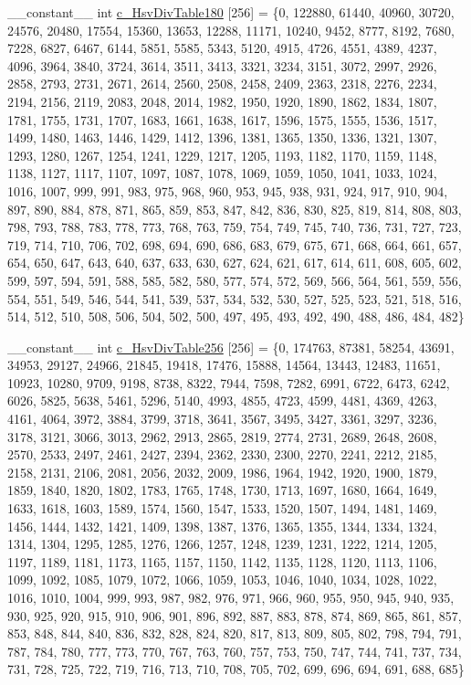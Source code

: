 \begin{DoxyCompactItemize}
\-\_\-\-\_\-constant\-\_\-\-\_\- int \hyperlink{namespacecv_1_1gpu_1_1device_1_1color__detail_abd5c2e4a272bbff844c98d0fccdcb3fa}{c\-\_\-\-Hsv\-Div\-Table180} \mbox{[}256\mbox{]} = \{0, 122880, 61440, 40960, 30720, 24576, 20480, 17554, 15360, 13653, 12288, 11171, 10240, 9452, 8777, 8192, 7680, 7228, 6827, 6467, 6144, 5851, 5585, 5343, 5120, 4915, 4726, 4551, 4389, 4237, 4096, 3964, 3840, 3724, 3614, 3511, 3413, 3321, 3234, 3151, 3072, 2997, 2926, 2858, 2793, 2731, 2671, 2614, 2560, 2508, 2458, 2409, 2363, 2318, 2276, 2234, 2194, 2156, 2119, 2083, 2048, 2014, 1982, 1950, 1920, 1890, 1862, 1834, 1807, 1781, 1755, 1731, 1707, 1683, 1661, 1638, 1617, 1596, 1575, 1555, 1536, 1517, 1499, 1480, 1463, 1446, 1429, 1412, 1396, 1381, 1365, 1350, 1336, 1321, 1307, 1293, 1280, 1267, 1254, 1241, 1229, 1217, 1205, 1193, 1182, 1170, 1159, 1148, 1138, 1127, 1117, 1107, 1097, 1087, 1078, 1069, 1059, 1050, 1041, 1033, 1024, 1016, 1007, 999, 991, 983, 975, 968, 960, 953, 945, 938, 931, 924, 917, 910, 904, 897, 890, 884, 878, 871, 865, 859, 853, 847, 842, 836, 830, 825, 819, 814, 808, 803, 798, 793, 788, 783, 778, 773, 768, 763, 759, 754, 749, 745, 740, 736, 731, 727, 723, 719, 714, 710, 706, 702, 698, 694, 690, 686, 683, 679, 675, 671, 668, 664, 661, 657, 654, 650, 647, 643, 640, 637, 633, 630, 627, 624, 621, 617, 614, 611, 608, 605, 602, 599, 597, 594, 591, 588, 585, 582, 580, 577, 574, 572, 569, 566, 564, 561, 559, 556, 554, 551, 549, 546, 544, 541, 539, 537, 534, 532, 530, 527, 525, 523, 521, 518, 516, 514, 512, 510, 508, 506, 504, 502, 500, 497, 495, 493, 492, 490, 488, 486, 484, 482\}
\item 
\-\_\-\-\_\-constant\-\_\-\-\_\- int \hyperlink{namespacecv_1_1gpu_1_1device_1_1color__detail_a06dee60b5257a350004f240de431795f}{c\-\_\-\-Hsv\-Div\-Table256} \mbox{[}256\mbox{]} = \{0, 174763, 87381, 58254, 43691, 34953, 29127, 24966, 21845, 19418, 17476, 15888, 14564, 13443, 12483, 11651, 10923, 10280, 9709, 9198, 8738, 8322, 7944, 7598, 7282, 6991, 6722, 6473, 6242, 6026, 5825, 5638, 5461, 5296, 5140, 4993, 4855, 4723, 4599, 4481, 4369, 4263, 4161, 4064, 3972, 3884, 3799, 3718, 3641, 3567, 3495, 3427, 3361, 3297, 3236, 3178, 3121, 3066, 3013, 2962, 2913, 2865, 2819, 2774, 2731, 2689, 2648, 2608, 2570, 2533, 2497, 2461, 2427, 2394, 2362, 2330, 2300, 2270, 2241, 2212, 2185, 2158, 2131, 2106, 2081, 2056, 2032, 2009, 1986, 1964, 1942, 1920, 1900, 1879, 1859, 1840, 1820, 1802, 1783, 1765, 1748, 1730, 1713, 1697, 1680, 1664, 1649, 1633, 1618, 1603, 1589, 1574, 1560, 1547, 1533, 1520, 1507, 1494, 1481, 1469, 1456, 1444, 1432, 1421, 1409, 1398, 1387, 1376, 1365, 1355, 1344, 1334, 1324, 1314, 1304, 1295, 1285, 1276, 1266, 1257, 1248, 1239, 1231, 1222, 1214, 1205, 1197, 1189, 1181, 1173, 1165, 1157, 1150, 1142, 1135, 1128, 1120, 1113, 1106, 1099, 1092, 1085, 1079, 1072, 1066, 1059, 1053, 1046, 1040, 1034, 1028, 1022, 1016, 1010, 1004, 999, 993, 987, 982, 976, 971, 966, 960, 955, 950, 945, 940, 935, 930, 925, 920, 915, 910, 906, 901, 896, 892, 887, 883, 878, 874, 869, 865, 861, 857, 853, 848, 844, 840, 836, 832, 828, 824, 820, 817, 813, 809, 805, 802, 798, 794, 791, 787, 784, 780, 777, 773, 770, 767, 763, 760, 757, 753, 750, 747, 744, 741, 737, 734, 731, 728, 725, 722, 719, 716, 713, 710, 708, 705, 702, 699, 696, 694, 691, 688, 685\}

\end{DoxyCompactItemize}
